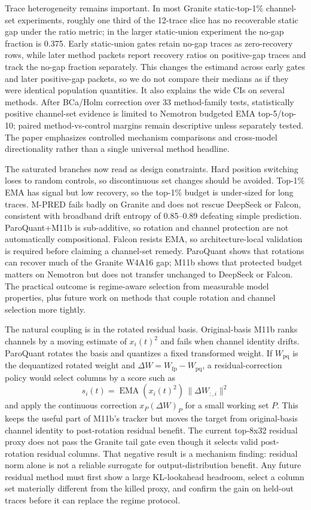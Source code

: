 \documentclass{article}
\begin{document}
Trace heterogeneity remains important. In most Granite static-top-1\% channel-set experiments, roughly one third of the 12-trace slice has no recoverable static gap under the ratio metric; in the larger static-union experiment the no-gap fraction is 0.375. Early static-union gates retain no-gap traces as zero-recovery rows, while later method packets report recovery ratios on positive-gap traces and track the no-gap fraction separately. This changes the estimand across early gates and later positive-gap packets, so we do not compare their medians as if they were identical population quantities. It also explains the wide CIs on several methods. After BCa/Holm correction over 33 method-family tests, statistically positive channel-set evidence is limited to Nemotron budgeted EMA top-5/top-10; paired method-vs-control margins remain descriptive unless separately tested. The paper emphasizes controlled mechanism comparisons and cross-model directionality rather than a single universal method headline.

The saturated branches now read as design constraints. Hard position switching loses to random controls, so discontinuous set changes should be avoided. Top-1\% EMA has signal but low recovery, so the top-1\% budget is under-sized for long traces. M-PRED fails badly on Granite and does not rescue DeepSeek or Falcon, consistent with broadband drift entropy of 0.85--0.89 defeating simple prediction. ParoQuant+M11b is sub-additive, so rotation and channel protection are not automatically compositional. Falcon resists EMA, so architecture-local validation is required before claiming a channel-set remedy. ParoQuant shows that rotations can recover much of the Granite W4A16 gap; M11b shows that protected budget matters on Nemotron but does not transfer unchanged to DeepSeek or Falcon. The practical outcome is regime-aware selection from measurable model properties, plus future work on methods that couple rotation and channel selection more tightly.

The natural coupling is in the rotated residual basis. Original-basis M11b ranks channels by a moving estimate of $x_i(t)^2$ and fails when channel identity drifts. ParoQuant rotates the basis and quantizes a fixed transformed weight. If $W_{\mathrm{pq}}$ is the dequantized rotated weight and $\Delta W=W_{\mathrm{fp}}-W_{\mathrm{pq}}$, a residual-correction policy would select columns by a score such as
\[
  s_i(t)=\operatorname{EMA}(x_i(t)^2)\,\|\Delta W_{:,i}\|^2
\]
and apply the continuous correction $x_P(\Delta W)_P$ for a small working set $P$. This keeps the useful part of M11b's tracker but moves the target from original-basis channel identity to post-rotation residual benefit. The current top-8x32 residual proxy does not pass the Granite tail gate even though it selects valid post-rotation residual columns. That negative result is a mechanism finding: residual norm alone is not a reliable surrogate for output-distribution benefit. Any future residual method must first show a large KL-lookahead headroom, select a column set materially different from the killed proxy, and confirm the gain on held-out traces before it can replace the regime protocol.
\end{document}
